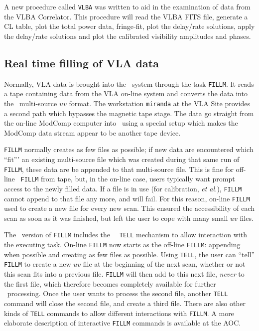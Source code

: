 A new procedure called {\tt VLBA} was written to aid in the
examination of data from the VLBA Correlator.  This procedure will
read the VLBA FITS file, generate a CL table, plot the total power
data, fringe-fit, plot the delay/rate solutions, apply the delay/rate
solutions and plot the calibrated visibility amplitudes and phases.

\subsection{Real time filling of VLA data}

Normally, VLA data is brought into the \AIPS\ system through the
task \hbox{{\tt FILLM}}.  It reads a tape containing data from the VLA
on-line system and converts the data into the \AIPS\ multi-source $uv$
format.  The workstation {\tt miranda} at the VLA Site provides a
second path which bypasses the magnetic tape stage.  The data go
straight from the on-line ModComp computer into \AIPS\ using a special
setup which makes the ModComp data stream appear to be another tape
device.

{\tt FILLM} normally creates as few files as possible; if new data are
encountered which ``fit''' an existing multi-source file which was
created during that same run of {\tt FILLM}, these data are be
appended to that multi-source file.  This is fine for off-line {\tt
FILLM} from tape, but, in the on-line case, users typically want
prompt access to the newly filled data.  If a file is in use (for
calibration, {\it et al.}), {\tt FILLM} cannot append to that file
any more, and will fail.  For this reason, on-line {\tt FILLM} used to
create a new file for every new scan.  This ensured the accessibility
of each scan as soon as it was finished, but left the user to cope
with many small $uv$ files.

The \RELEASENAME\ version of {\tt FILLM} includes the \AIPS\ {\tt
TELL} mechanism to allow interaction with the executing task. On-line
{\tt FILLM} now starts as the off-line {\tt FILLM}: appending when
possible and creating as few files as possible.  Using {\tt TELL}, the
user can ``tell'' {\tt FILLM} to create a new $uv$ file at the
beginning of the next scan, whether or not this scan fits into a
previous file.  {\tt FILLM} will then add to this next file, {\it
never} to the first file, which therefore becomes completely available
for further \AIPS\ processing.  Once the user wants to process the
second file, another {\tt TELL} command will close the second file,
and create a third file.  There are also other kinds of {\tt TELL}
commands to allow different interactions with \hbox{{\tt FILLM}}.  A
more elaborate description of interactive {\tt FILLM} commands is
available at the \hbox{{AOC}}.

